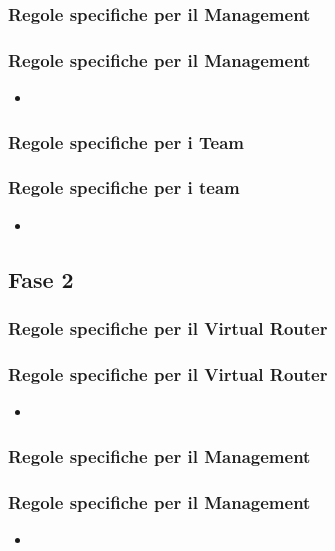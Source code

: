\documentclass{beamer}
\begin{document}
\subsubsection{Regole specifiche per il Management}
\begin{frame}
    \frametitle{Regole specifiche per il Management}
    \begin{itemize}
        \item 
    \end{itemize}

\end{frame}

\subsubsection{Regole specifiche per i Team}
\begin{frame}
    \frametitle{Regole specifiche per i team}
    \begin{itemize}
        \item 
    \end{itemize}

\end{frame}

\subsection{Fase 2}
\subsubsection{Regole specifiche per il Virtual Router}
\begin{frame}
    \frametitle{Regole specifiche per il Virtual Router}
    \begin{itemize}
        \item 
    \end{itemize}
\end{frame}


\subsubsection{Regole specifiche per il Management}
\begin{frame}
    \frametitle{Regole specifiche per il Management}
    \begin{itemize}
        \item 
    \end{itemize}

\end{frame}
\end{document}
